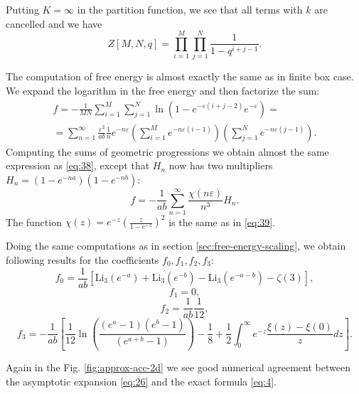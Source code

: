 \documentclass{article}
\newcommand{\Li}{\mathrm{Li}}
\begin{document}
Putting $K=\infty$ in the partition function, we see that all terms with $k$ are cancelled and we have
\begin{equation}
  \label{eq:3}
  Z[M,N,q]=\prod_{i=1}^{M}\prod_{j=1}^{N}\frac{1}{1-q^{i+j-1}}.
\end{equation}

The computation of free energy is almost exactly the same as in finite box case. We expand the
logarithm in the free energy and then factorize the sum:
\begin{multline}
  \label{eq:4}
  f=-\frac{1}{MN}\sum_{i=1}^{M}\sum_{j=1}^{N}\ln\left(1-e^{-\varepsilon(i+j-2)}e^{-\varepsilon}\right)=\\
  =\sum_{n=1}^{\infty}\frac{\varepsilon^{2}}{ab}\frac{1}{n}e^{-n\varepsilon}\left(\sum_{i=1}^{M}e^{-n\varepsilon(i-1)}\right)
  \left(\sum_{j=1}^{N}e^{-n\varepsilon(j-1)}\right).
\end{multline}
Computing the sums of geometric progressions we obtain almost the same expression as \eqref{eq:38},
except that $H_{n}$ now has two multipliers $H_{n} =\left(1-e^{-na}\right)\left(1-e^{-nb}\right)$:
\begin{equation}
  \label{eq:5}
  f=-\frac{1}{ab} \sum_{n=1}^{\infty}\frac{\chi(n\varepsilon)}{n^{3}} H_{n}.
\end{equation}
The function $\chi(z)=e^{-z}\left(\frac{z}{1-e^{-z}}\right)^{2}$ is the same as in \eqref{eq:39}.

Doing the same computations as in section \ref{sec:free-energy-scaling}, we obtain following results
for the coefficients $f_{0}, f_{1}, f_{2}, f_{3}$:
\begin{equation}
  \label{eq:6}
  f_{0}=\frac{1}{ab}\left[\Li_{3}(e^{-a})+\Li_{3}(e^{-b})-
    \Li_{3}(e^{-a-b})-\zeta(3)\right],
\end{equation}
\begin{equation}
  \label{eq:8}
  f_{1}=0,
\end{equation}
\begin{equation}
  \label{eq:9}
  f_{2}=\frac{1}{ab}\frac{1}{12},
\end{equation}
\begin{equation}
  \label{eq:11}
  f_{3}=-\frac{1}{ab}\left[\frac{1}{12}\ln\left(\frac{(e^{a}-1)(e^{b}-1)}{(e^{a+b}-1)}\right)-\frac{1}{8}+ \frac{1}{2}\int_{0}^{\infty} e^{-z}\frac{\xi(z)-\xi(0)}{z} dz
    \right].
\end{equation}

Again in the Fig. \ref{fig:approx-acc-2d} we see good numerical agreement between the asymptotic
expansion \eqref{eq:26} and the exact formula \eqref{eq:4}.
\end{document}
